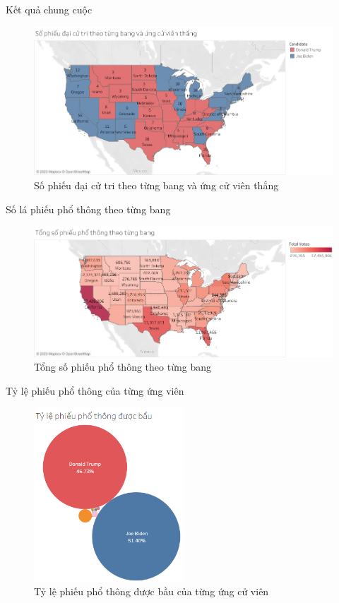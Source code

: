 \documentclass[10pt]{beamer}
\theoremstyle{remark}
\theoremstyle{definition}
\begin{document}
\begin{frame}{Kết quả chung cuộc}
	\begin{figure}[h!]
        \centering
        \includegraphics[width=\textwidth]{Electoral_Votes_States.png}
        \caption{Số phiếu đại cử tri theo từng bang và ứng cử viên thắng}
    \end{figure}
\end{frame}

\begin{frame}{Số lá phiếu phổ thông theo từng bang}
	\begin{figure}[h!]
        \centering
        \includegraphics[width=\textwidth]{Popular_Votes_States_by_Color.png}
        \caption{Tổng số phiếu phổ thông theo từng bang}
    \end{figure}
\end{frame}

\begin{frame}{Tỷ lệ phiếu phổ thông của từng ứng viên}
	\begin{figure}[h!]
        \centering
        \includegraphics[width=0.5\textwidth]{Percentage_Total_Candidates_Bubble_Chart.png}
        \caption{Tỷ lệ phiếu phổ thông được bầu của từng ứng cử viên}
    \end{figure}
\end{frame}
\end{document}
